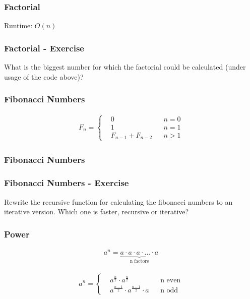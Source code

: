 \begin{frame}[fragile]
\frametitle{Factorial}
{\tiny

}
Runtime: $O(n)$
\end{frame}

\begin{frame}[fragile]
\frametitle{Factorial - Exercise}
\begin{exercise}
What is the biggest number for which the factorial could be calculated (under usage
of the code above)?
\end{exercise}
\end{frame}

\begin{frame}[fragile]
\frametitle{Fibonacci Numbers}
\begin{definition}
\begin{align}
F_n=\left\{
\begin{aligned} & 0 & & n=0\\
& 1 & & n=1\\
& F_{n-1} + F_{n-2} & & n>1
\end{aligned}\right.
\end{align}
\end{definition}
\end{frame}

\begin{frame}[fragile]
\frametitle{Fibonacci Numbers}
{\tiny

}
\end{frame}

\begin{frame}[fragile]
\frametitle{Fibonacci Numbers - Exercise}
\begin{exercise}
Rewrite the recursive function for calculating the fibonacci numbers to an iterative
version. Which one is faster, recursive or iterative?
\end{exercise}
\end{frame}

\begin{frame}[fragile]
\frametitle{Power}

\begin{definition}[Power]
\begin{align}
a^n = \underbrace{a \cdot a \cdot a \cdot ... \cdot a}_\text{n factors}
\end{align}
\end{definition}

\begin{definition}
\begin{align}
a^n=\left\{\begin{aligned} & a^{\frac{n}{2}} \cdot a^{\frac{n}{2}} & & \text{n even}\\
& a^{\frac{n-1}{2}} \cdot a^{\frac{n-1}{2}} \cdot a & & \text{n odd} \end{aligned}\right.
\end{align}
\end{definition}

\end{frame}

